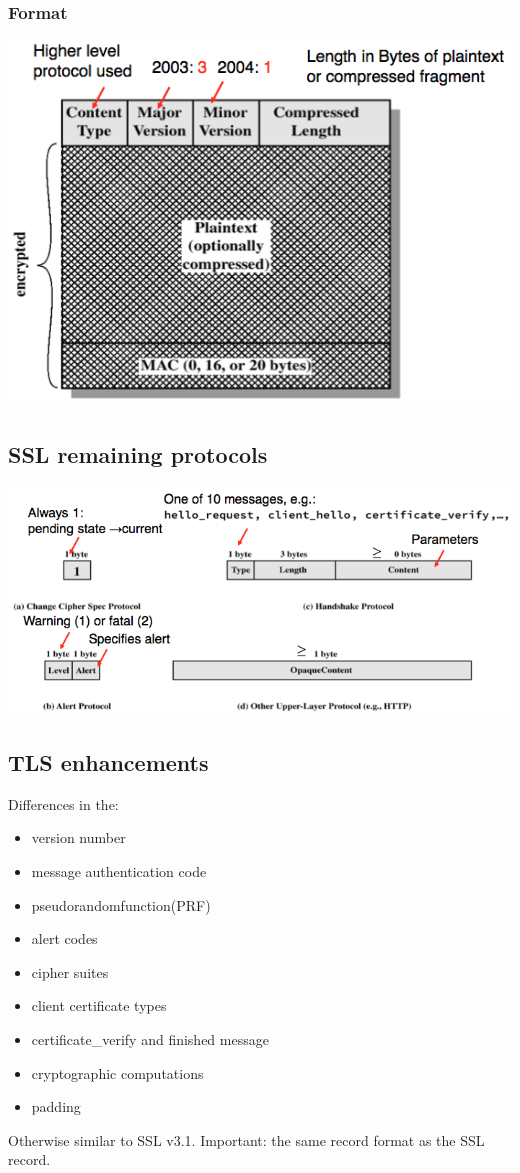 \documentclass[10pt]{article}
\begin{document}
\subsubsection{Format}
\begin{center}
	\includegraphics[scale=0.4]{ssl_record_format.png}
\end{center}
\subsection{SSL remaining protocols}
\begin{center}
	\includegraphics[scale=0.4]{ssl_remaining_protocols.png}
\end{center}
\subsection{TLS enhancements}
Differences in the:
\begin{itemize}
	\item version number
	\item message authentication code
	\item pseudorandomfunction(PRF)
	\item alert codes
	\item cipher suites
	\item client certificate types
	\item certificate\_verify and finished message
	\item cryptographic computations
	\item padding
\end{itemize}
Otherwise similar to SSL v3.1. Important: the same record format as the SSL record.
\end{document}
